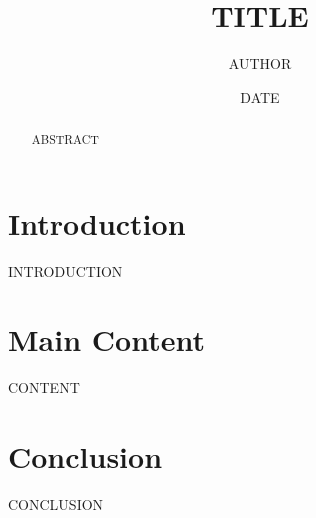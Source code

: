 \documentclass[12pt,a4paper]{article}
\title{{{TITLE}}}
\author{{{AUTHOR}}}
\date{{{DATE}}}
\begin{document}
\maketitle
\doublespacing

\begin{abstract}
{{ABSTRACT}}
\end{abstract}

\section{Introduction}
{{INTRODUCTION}}

\section{Main Content}
{{CONTENT}}

\section{Conclusion}
{{CONCLUSION}}



\end{document}
